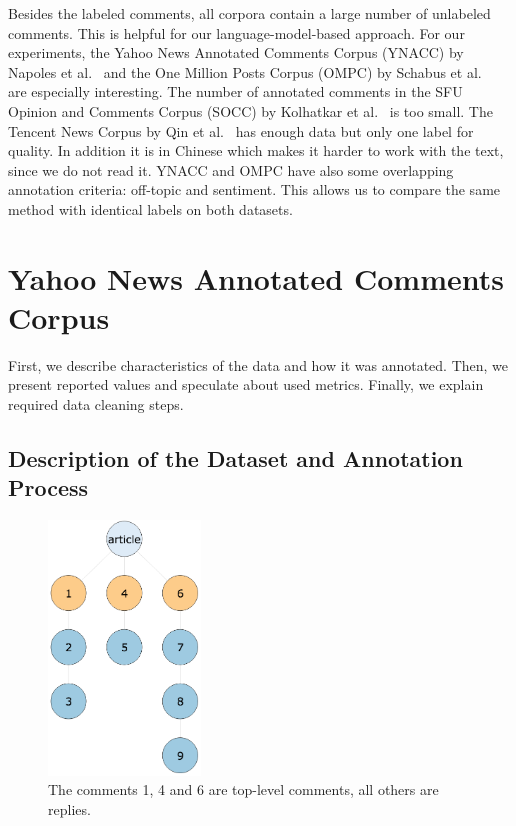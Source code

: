 Besides the labeled comments, all corpora contain a large number of unlabeled comments. This is helpful for our language-model-based approach. For our experiments, the Yahoo News Annotated Comments Corpus (YNACC) by Napoles et al.~\cite{napoles2017finding} and the One Million Posts Corpus (OMPC) by Schabus et al.~\cite{schabus_academic-industrial_nodate,Schabus:2017:OMP:3077136.3080711} are especially interesting. The number of annotated comments in the SFU Opinion and Comments Corpus (SOCC) by Kolhatkar et al.~\cite{kolhatkar2018sfu} is too small. The Tencent News Corpus by Qin et al.~\cite{2018arXiv180503668Q} has enough data but only one label for quality.
In addition it is in Chinese which makes it harder to work with the text, since we do not read it.
YNACC and OMPC have also some overlapping annotation criteria: off-topic and sentiment. This allows us to compare the same method with identical labels on both datasets.

\section{Yahoo News Annotated Comments Corpus}
\label{sec:datasets_ynacc}

First, we describe characteristics of the data and how it was annotated.
Then, we present reported values and speculate about used metrics. Finally, we explain required data cleaning steps.

\subsection{Description of the Dataset and Annotation Process}
\label{subsec:datasets_ynacc_description}

\begin{figure}
  \begin{center}
    \includegraphics[width=0.36\textwidth]{images/datasets/sequential_structure.png}
  \end{center}
  \caption{The comments 1, 4 and 6 are top-level comments, all others are replies.}
\end{figure}

